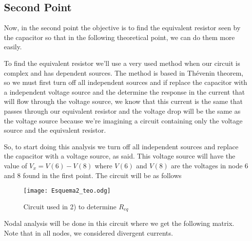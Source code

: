 \subsection{Second Point}
\label{ssec:2T}

\par Now, in the second point the objective is to find the equivalent resistor seen by the capacitor so that in the following theoretical point, we can do them more easily.
\par To find the equivalent resistor we'll use a very used method when our circuit is complex and has dependent sources. The method is based in Thévenin theorem, so we must first turn off all independent sources and if replace the capacitor with a independent voltage source and the determine the response in the current that will flow through the voltage source, we know that this current is the same that passes through our equivalent resistor and the voltage drop will be the same as the voltage source because we're imagining a circuit containing only the voltage source and the equivalent resistor. 
\par So, to start doing this analysis we turn off all independent sources and replace the capacitor with a voltage source, as said. This voltage source will have the value of $V_x=V(6)-V(8)$ where $V(6)$ and $V(8)$ are the voltages in node 6 and 8 found in the first point. The circuit will be as follows

\begin{figure}[H] \centering
\texttt{[image: Esquema2\_teo.odg]}
\caption{Circuit used in 2) to determine $R_{eq}$}
\label{fig:Cir_2)}
\end{figure}

\par Nodal analysis will be done in this circuit where we get the following matrix. Note that in all nodes, we considered divergent currents.

